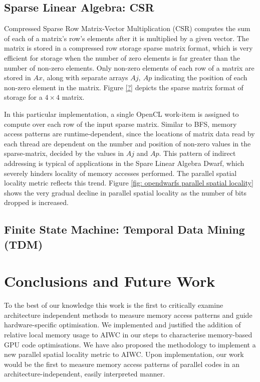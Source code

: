 \documentclass[review=false, sigchi]{acmart}
\begin{document}
	\subsection{Sparse Linear Algebra: CSR}
	
	Compressed Sparse Row Matrix-Vector Multiplication (CSR) computes the sum of each of a matrix's row's elements after it is multiplied by a given vector. The matrix is stored in a compressed row storage sparse matrix format, which is very efficient for storage when the number of zero elements is far greater than the number of non-zero elements. Only non-zero elements of each row of a matrix are stored in $Ax$, along with separate arrays $Aj,\ Ap$ indicating the position of each non-zero element in the matrix. Figure \ref{?} depicts the sparse matrix format of storage for a $4\times4$ matrix.
	
	In this particular implementation, a single OpenCL work-item is assigned to compute over each row of the input sparse matrix. Similar to BFS, memory access patterns are runtime-dependent, since the locations of matrix data read by each thread are dependent on the number and position of non-zero values in the sparse-matrix, decided by the values in $Aj$ and $Ap$. This pattern of indirect addressing is typical of applications in the Spare Linear Algebra Dwarf, which severely hinders locality of memory accesses performed. The parallel spatial locality metric reflects this trend. Figure \ref{fig: opendwarfs parallel spatial locality} shows the very gradual decline in parallel spatial locality as the number of bits dropped is increased.
	
	\subsection{Finite State Machine: Temporal Data Mining (TDM)}
	
	
	\section{Conclusions and Future Work} \label{future work}
	
	To the best of our knowledge this work is the first to critically examine architecture independent methods to measure memory access patterns and guide hardware-specific optimisation. We implemented and justified the addition of relative local memory usage to AIWC in our steps to characterise memory-based GPU code optimisations. We have also proposed the methodology to implement a new parallel spatial locality metric to AIWC. Upon implementation, our work would be the first to measure memory access patterns of parallel codes in an architecture-independent, easily interpreted manner.
	
\end{document}
